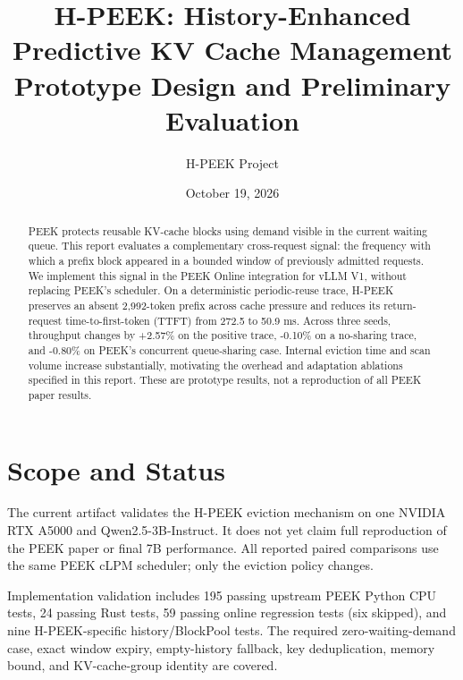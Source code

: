 \documentclass[10pt,twocolumn]{article}
\title{H-PEEK: History-Enhanced Predictive KV Cache Management\\
       \large Prototype Design and Preliminary Evaluation}
\author{H-PEEK Project}
\date{October 19, 2026}
\begin{document}
\maketitle

\begin{abstract}
PEEK protects reusable KV-cache blocks using demand visible in the current
waiting queue. This report evaluates a complementary cross-request signal: the
frequency with which a prefix block appeared in a bounded window of previously
admitted requests. We implement this signal in the PEEK Online integration for
vLLM V1, without replacing PEEK's scheduler. On a deterministic periodic-reuse
trace, H-PEEK preserves an absent 2,992-token prefix across cache pressure and
reduces its return-request time-to-first-token (TTFT) from 272.5 to 50.9 ms.
Across three seeds, throughput changes by +2.57\% on the positive trace,
-0.10\% on a no-sharing trace, and -0.80\% on PEEK's concurrent queue-sharing
case. Internal eviction time and scan volume increase substantially, motivating
the overhead and adaptation ablations specified in this report. These are
prototype results, not a reproduction of all PEEK paper results.
\end{abstract}

\section{Scope and Status}

The current artifact validates the H-PEEK eviction mechanism on one NVIDIA RTX
A5000 and Qwen2.5-3B-Instruct. It does not yet claim full reproduction of the
PEEK paper or final 7B performance. All reported paired comparisons use the
same PEEK cLPM scheduler; only the eviction policy changes.

Implementation validation includes 195 passing upstream PEEK Python CPU tests,
24 passing Rust tests, 59 passing online regression tests (six skipped), and
nine H-PEEK-specific history/BlockPool tests. The required zero-waiting-demand
case, exact window expiry, empty-history fallback, key deduplication, memory
bound, and KV-cache-group identity are covered.
\end{document}

